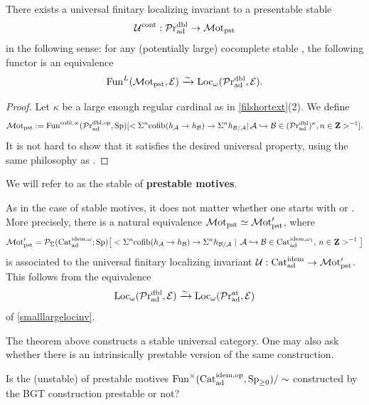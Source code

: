 \documentclass[a4paper,10pt, oneside]{amsart}
\begin{document}
\begin{thm}\label{defmotpst}
	There exists a  universal finitary localizing invariant to a presentable stable \infcat $$\mathcal{U}^{\mathrm{cont}}:\mathcal{P}\mathrm{r}_{\mathrm{ad}}^{\mathrm{dbl}}\to \mathcal{M}\mathrm{ot}_{\mathrm{pst}}$$ in the following sense: for any (potentially large) cocomplete stable \infcat \mce, the following functor is an equivalence
	$$\operatorname{Fun}^L(\mathcal{M}\mathrm{ot}_{\mathrm{pst}},\mathcal{E})\xrightarrow{\sim}\operatorname{Loc}_\omega(\mathcal{P}\mathrm{r}_{\mathrm{ad}}^{\mathrm{dbl}},\mathcal{E}).$$
\end{thm}
\begin{proof}Let $\kappa$ be a large enough regular cardinal as in \cref{filshortext}(2).
	We define $$\mathcal{M}\mathrm{ot}_{\mathrm{pst}}:= \operatorname{Fun}^{\mathrm{cofil},\times}(\mathcal{P}\mathrm{r}_{\mathrm{ad}}^{\mathrm{dbl,op}},\mathrm{Sp})[<\Sigma^n\mathrm{cofib}(h_\mathcal{A}\to h_\mathcal{B})\to \Sigma^nh_{\mathcal{B}/\mathcal{A}}|\,\mathcal{A}\hookrightarrow\mathcal{B}\in (\mathcal{P}\mathrm{r}_{\mathrm{ad}}^{\mathrm{dbl}})^{\kappa}, n\in\mathbf{Z}>^{-1} ].$$  It is not hard to show that it satisfies the desired universal property, using the same philosophy as \cite{blumberg2013universal}. 	 
\end{proof}
\begin{de}
	We will refer to \motpst as the stable \infcat of \textbf{prestable motives}.
\end{de}

\begin{rem}
	As in the case of stable motives, it does not matter whether one starts with \praddbl or \pradat. More precisely, there is a natural equivalence $\mathcal{M}\mathrm{ot}_{\mathrm{pst}}\simeq \mathcal{M}\mathrm{ot}_{\mathrm{pst}}^\prime$, where
	$$
	\mathcal{M}\mathrm{ot}_{\mathrm{pst}}^\prime=\mathcal{P}_{\Sigma}(\mathrm{Cat}_{\mathrm{ad}}^{\mathrm{idem},\omega};\mathrm{Sp})\big[<\Sigma^n\mathrm{cofib}(h_\mathcal{A}\to h_\mathcal{B})\to \Sigma^nh_{\mathcal{B}/\mathcal{A}}\mid\,\mathcal{A}\hookrightarrow\mathcal{B}\in \mathrm{Cat}_{\mathrm{ad}}^{\mathrm{idem},\omega_1},\, n\in\mathbf{Z}>^{-1} \big]
	$$
	is associated to the universal finitary localizing invariant $\mathcal{U}:\mathrm{Cat}_{\mathrm{ad}}^{\mathrm{idem}}\to \mathcal{M}\mathrm{ot}_{\mathrm{pst}}^\prime$. This follows from the equivalence
	$$
	\operatorname{Loc}_\omega(\mathcal{P}\mathrm{r}_{\mathrm{ad}}^{\mathrm{dbl}},\mathcal{E})\xrightarrow{\sim}\operatorname{Loc}_\omega(\mathcal{P}\mathrm{r}_{\mathrm{ad}}^{\mathrm{at}},\mathcal{E})
	$$
	of \cref{smalllargelocinv}.
	\end{rem}


The theorem above constructs a stable universal category.  One may also ask
whether there is an intrinsically prestable version of the same construction.
\begin{quest}
	Is the (unstable) \infcat of  prestable motives $\operatorname{Fun}^\times(\mathrm{Cat}_{\mathrm{ad}}^{\mathrm{idem,op}},\operatorname{Sp}_{\geq0})/\sim $ constructed by the BGT construction  prestable or not?
\end{quest}
\end{document}
